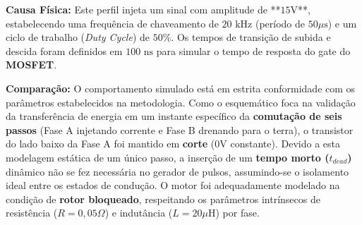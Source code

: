 \documentclass[12pt, a4paper, openright, oneside, brazilian]{abntex2}
\begin{document}
\textbf{Causa Física:} Este perfil injeta um sinal com amplitude de **$15\text{V}$**, estabelecendo uma frequência de chaveamento de \textbf{$20\text{ kHz}$} (período de $50 \mu\text{s}$) e um ciclo de trabalho (\textit{Duty Cycle}) de \textbf{$50\%$}. Os tempos de transição de subida e descida foram definidos em $100\text{ ns}$ para simular o tempo de resposta do gate do \textbf{MOSFET}. 

\textbf{Comparação:} O comportamento simulado está em estrita conformidade com os parâmetros estabelecidos na metodologia. Como o esquemático foca na validação da transferência de energia em um instante específico da \textbf{comutação de seis passos} (Fase A injetando corrente e Fase B drenando para o terra), o transistor do lado baixo da Fase A foi mantido em \textbf{corte} ($0\text{V}$ constante). Devido a esta modelagem estática de um único passo, a inserção de um \textbf{tempo morto ($t_{dead}$)} dinâmico não se fez necessária no gerador de pulsos, assumindo-se o isolamento ideal entre os estados de condução. O motor foi adequadamente modelado na condição de \textbf{rotor bloqueado}, respeitando os parâmetros intrínsecos de resistência ($R = 0,05 \Omega$) e indutância ($L = 20 \mu\text{H}$) por fase.

\postextual
\printbibliography
\end{document}
